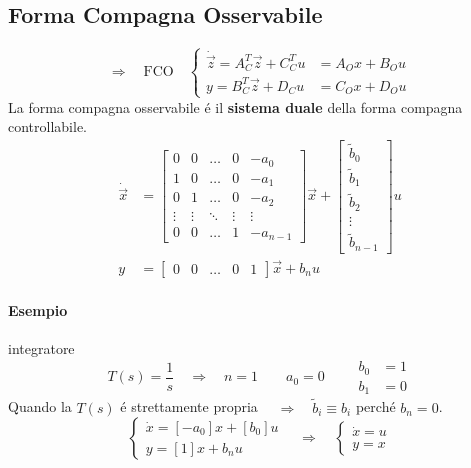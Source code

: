 \documentclass[../main.tex]{subfiles}
\begin{document}
	\subsection{Forma Compagna Osservabile}
		\[
			\Rightarrow\quad\text{FCO}\quad
			\begin{cases}
				\dot{\vec z} = A_C^T \vec z + C_C^T u &= A_O x + B_O u\\
				y = B_C^T \vec z + D_C u &= C_O x + D_O u
			\end{cases}
		\]
		La forma compagna osservabile \'e il \textbf{sistema duale} della forma compagna controllabile.
		\[
			\begin{aligned}
				\dot{\vec x} &=
				\begin{bmatrix}
					0 & 0 & \dots & 0 & -a_0 \\
					1 & 0 & \dots & 0 & -a_1 \\
					0 & 1 & \dots & 0 & -a_2 \\
					\vdots & \vdots & \ddots & \vdots & \vdots \\
					0 & 0 & \dots & 1 & -a_{n-1}
				\end{bmatrix} \vec x+
				\begin{bmatrix}
					\tilde b_0\\
					\tilde b_1\\
					\tilde b_2\\
					\vdots\\
					\tilde b_{n-1}
				\end{bmatrix} u
				\\
				y &=
				\begin{bmatrix}
					0 & 0 & \dots & 0 & 1
				\end{bmatrix} \vec x + b_n u
			\end{aligned}
		\]
		
		\begin{mdframed}[style=Esempio]
			\paragraph{Esempio} integratore
				\[
					T(s) = \dfrac{1}{s} \quad\Rightarrow\quad n=1 \qquad
					a_0 = 0 \qquad
					\begin{aligned}
						b_0 &= 1\\
						b_1 &= 0
					\end{aligned}
				\]
				Quando la $ T(s) $ \'e strettamente propria $ \quad\Rightarrow\quad \tilde b_i \equiv b_i $ perch\'e $ b_n = 0 $.
				\[
					\begin{cases}
						\dot x = [-a_0] x + [b_0] u\\
						y = [1] x + b_n u
					\end{cases}
					\quad\Rightarrow\quad
					\begin{cases}
						\dot x = u\\
						y = x
					\end{cases}
				\]
		\end{mdframed}
	
\end{document}
